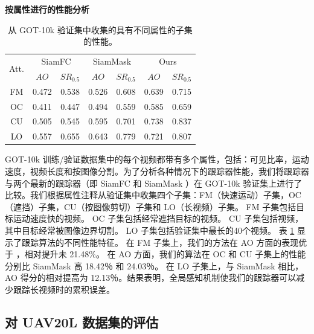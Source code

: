\textbf{按属性进行的性能分析} 
\begin{table}
\centering
\caption{从 GOT-10k 验证集中收集的具有不同属性的子集的性能。}
\begin{tabular}{|c|c|c|c|c|c|c|}
\hline
\multirow{2}{*}{Att.} &
\multicolumn{2}{c|}{SiamFC} & \multicolumn{2}{c|}{SiamMask} &\multicolumn{2}{c|}{Ours} \\
\cline{2-7} & $AO$ & $SR_{0.5}$ & $AO$ & $SR_{0.5}$ & $AO$ & $SR_{0.5}$ \\
\hline
FM & 0.472 & 0.538 & 0.526 & 0.608 & 0.639 & 0.715 \\
\hline
OC & 0.411 & 0.447 & 0.494 & 0.559 & 0.585 & 0.659 \\
\hline
CU & 0.505 & 0.545 & 0.595 & 0.701 & 0.738 & 0.837 \\
\hline
LO & 0.557 & 0.655 & 0.643 & 0.779 & 0.721 & 0.807 \\
\hline
\end{tabular}
\label{table:attribute}
\end{table}
GOT-10k 训练/验证数据集中的每个视频都带有多个属性，包括：可见比率，运动速度，视频长度和按图像分割。为了分析各种情况下的跟踪器性能，我们将跟踪器与两个最新的跟踪器（即 SiamFC  \cite{SiamFC} 和 SiamMask \cite{Wang2018SiamMask}）在 GOT-10k 验证集上进行了比较。我们根据属性注释从验证集中收集四个子集：FM（快速运动）子集，OC（遮挡）子集，CU（按图像剪切）子集和 LO（长视频）子集。
FM 子集包括目标运动速度快的视频。
OC 子集包括经常遮挡目标的视频。
CU 子集包括视频，其中目标经常被图像边界切割。
LO 子集包括验证集中最长的40个视频。
表 \ref{table:attribute} 显示了跟踪算法的不同性能特征。
在 FM 子集上，我们的方法在 AO 方面的表现优于 \cite{Wang2018SiamMask}，相对提升未 21.48\%。
在 AO 方面，我们的算法在 OC 和 CU 子集上的性能分别比 SiamMask 高 18.42％ 和 24.03％。
在 LO 子集上，与 SiamMask 相比，AO 得分的相对提高为 12.13％。结果表明，全局感知机制使我们的跟踪器可以减少跟踪长视频时的累积误差。

\subsection{对 UAV20L 数据集的评估}

